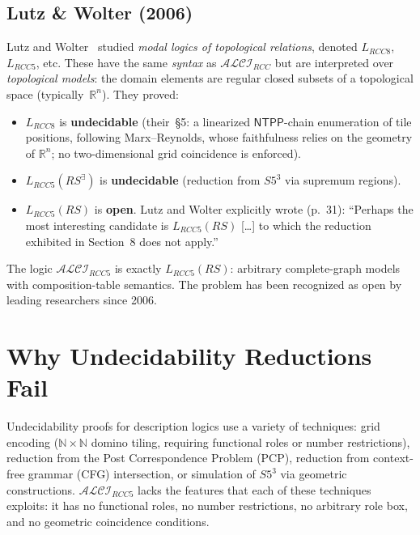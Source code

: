 \documentclass[
]{ceurart}
\theoremstyle{definition}
\newcommand{\ALCIRCC}[1]{\ensuremath{\mathcal{ALCI}_{\mathit{RCC#1}}}}
\newcommand{\LRCC}[1]{\ensuremath{L_{\mathit{RCC#1}}}}
\newcommand{\NTPP}{\ensuremath{\mathsf{NTPP}}}
\newcommand{\naturals}{\mathbb{N}}
\newcommand{\reals}{\mathbb{R}}
\begin{document}
\subsection{Lutz \& Wolter (2006)}

Lutz and Wolter~\cite{LutzWolter2006} studied \emph{modal logics
of topological relations}, denoted $\LRCC{8}$, $\LRCC{5}$, etc.
These have the same \emph{syntax} as $\ALCIRCC{}$ but are
interpreted over \emph{topological models}: the domain elements
are regular closed subsets of a topological space (typically~$\reals^n$).
They proved:
\begin{itemize}
  \item $\LRCC{8}$ is \textbf{undecidable} (their~\S5: a linearized
    $\NTPP$-chain enumeration of tile positions, following
    Marx--Reynolds, whose faithfulness relies on the geometry of
    $\reals^n$; no two-dimensional grid coincidence is enforced).
  \item $\LRCC{5}(\mathit{RS}^\exists)$ is \textbf{undecidable}
    (reduction from $S5^3$ via supremum regions).
  \item $\LRCC{5}(\mathit{RS})$ is \textbf{open}. Lutz and Wolter
    explicitly wrote (p.~31): ``Perhaps the most interesting
    candidate is $L_{RCC5}(RS)$ [\ldots] to which the reduction
    exhibited in Section~8 does not apply.''
\end{itemize}

The logic $\ALCIRCC{5}$ is exactly $\LRCC{5}(\mathit{RS})$:
arbitrary complete-graph models with composition-table semantics.
The problem has been recognized as open by leading researchers
since 2006.

\section{Why Undecidability Reductions Fail}
\label{sec:undecidability}

Undecidability proofs for description logics use a variety of
techniques: grid encoding ($\naturals \times \naturals$ domino
tiling, requiring functional roles or number restrictions),
reduction from the Post Correspondence Problem (PCP), reduction
from context-free grammar (CFG) intersection, or simulation of
$S5^3$ via geometric constructions.
$\ALCIRCC{5}$ lacks the features that each of these techniques
exploits: it has no functional roles, no number restrictions,
no arbitrary role box, and no geometric coincidence conditions.
\end{document}
